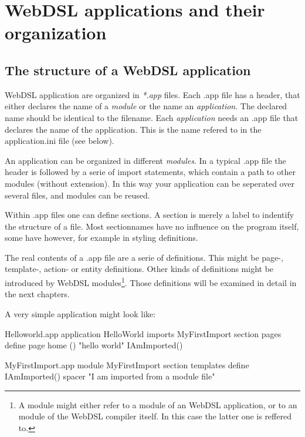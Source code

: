 \chapter{WebDSL applications and their organization}

\section{The structure of a WebDSL application}
WebDSL application are organized in \emph{*.app} files. Each .app file has a header, that either declares the name of a \emph{module} or the name an \emph{application}. The declared name should be identical to the filename. Each \emph{application} needs an .app file that declares the name of the application. This is the name refered to in the application.ini file (see below). 

An application can be organized in different \emph{modules}. In a typical .app file the header is followed by a serie of import statements, which contain a path to other modules (without extension). In this way your application can be seperated over several files, and modules can be reused. 

Within .app files one can define sections. A section is merely a label to indentify the structure of a file. Most sectionnames have no influence on the program itself, some have however, for example in styling definitions. 

The real contents of a .app file are a serie of definitions. This might be page-, template-, action- or entity definitions. Other kinds of definitions might be introduced by WebDSL modules\footnote{A module might either refer to a module of an WebDSL application, or to an module of the WebDSL compiler itself. In this case the latter one is reffered to.}. Those definitions will be examined in detail in the next chapters. 

A very simple application might look like:
\begin{webdsl}{Helloworld.app}
application HelloWorld
imports MyFirstImport
section pages
define page home () { 
	"hello world" IAmImported() 
}
\end{webdsl}

\begin{webdsl}{MyFirstImport.app}
module MyFirstImport
section templates
define IAmImported() { 
	spacer "I am imported from a module file" 
}
\end{webdsl}

